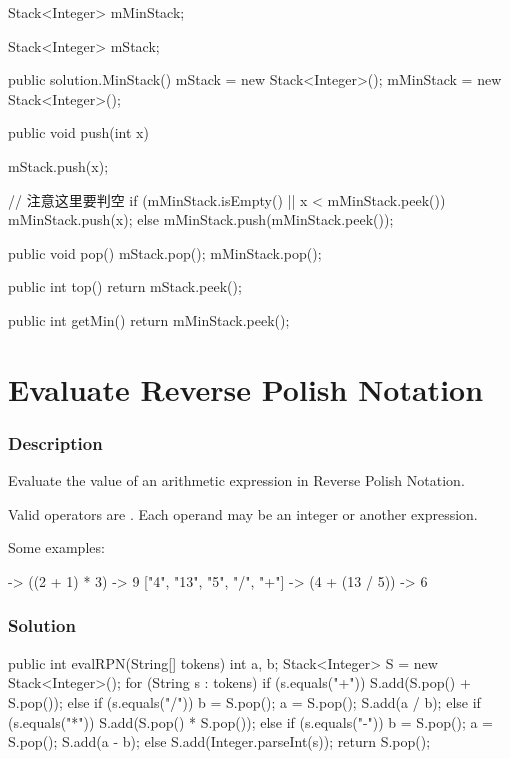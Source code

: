 \begin{Code}
Stack<Integer> mMinStack;

Stack<Integer> mStack;

public solution.MinStack() {
    mStack = new Stack<Integer>();
    mMinStack = new Stack<Integer>();
}

public void push(int x) {
    mStack.push(x);

    // 注意这里要判空
    if (mMinStack.isEmpty() || x < mMinStack.peek()) {
        mMinStack.push(x);
    } else {
        mMinStack.push(mMinStack.peek());
    }
}

public void pop() {
    mStack.pop();
    mMinStack.pop();
}

public int top() {
    return mStack.peek();
}

public int getMin() {
    return mMinStack.peek();
}
\end{Code}

\newpage

\section{Evaluate Reverse Polish Notation} %

\subsubsection{Description}
Evaluate the value of an arithmetic expression in Reverse Polish Notation.

Valid operators are \code{+, -, *, /}. Each operand may be an integer or another expression.

Some examples:
\begin{Code}
  ["2", "1", "+", "3", "*"] -> ((2 + 1) * 3) -> 9
  ["4", "13", "5", "/", "+"] -> (4 + (13 / 5)) -> 6
\end{Code}

\subsubsection{Solution}

\begin{Code}
public int evalRPN(String[] tokens) {
    int a, b;
    Stack<Integer> S = new Stack<Integer>();
    for (String s : tokens) {
        if (s.equals("+")) {
            S.add(S.pop() + S.pop());
        } else if (s.equals("/")) {
            b = S.pop();
            a = S.pop();
            S.add(a / b);
        } else if (s.equals("*")) {
            S.add(S.pop() * S.pop());
        } else if (s.equals("-")) {
            b = S.pop();
            a = S.pop();
            S.add(a - b);
        } else {
            S.add(Integer.parseInt(s));
        }
    }
    return S.pop();
}
\end{Code}

